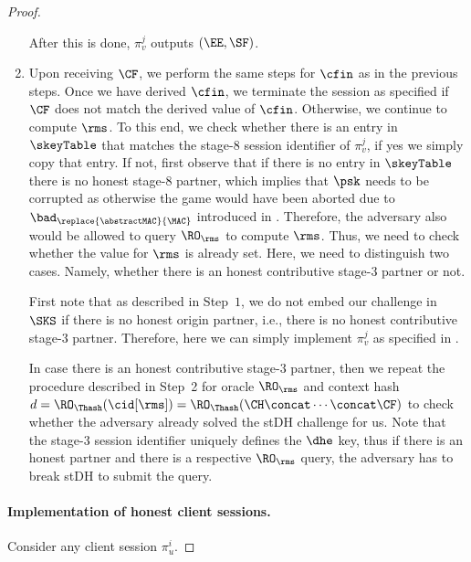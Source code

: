 \begin{proof}
\begin{enumerate}
		After this is done, $\pi_v^j$ outputs $(\EE, \SF)$.
%		
		\item Upon receiving $\CF$, we perform the same steps for $\cfin$ as in the previous steps.
		Once we have derived $\cfin$, we terminate the session as specified if $\CF$ does not match the derived value of $\cfin$.
		Otherwise, we continue to compute $\rms$.
		To this end, we check whether there is an entry in $\skeyTable$ that matches the stage-$8$ session identifier of $\pi_v^j$, if yes we simply copy that entry.
		If not, first observe that if there is no entry in $\skeyTable$ there is no honest stage-$8$ partner, which implies that $\psk$ needs to be corrupted as otherwise the game would have been aborted due to $\bad_{\replace{\abstractMAC}{\MAC}}$ introduced in .
		Therefore, the adversary also would be allowed to query $\RO_\rms$ to compute $\rms$.
		Thus, we need to check whether the value for $\rms$ is already set.
		Here, we need to distinguish two cases.
		Namely, whether there is an honest contributive stage-$3$ partner or not.
		
		First note that as described in Step~$1$, we do not embed our challenge in $\SKS$ if there is no honest origin partner, i.e., there is no honest contributive stage-$3$ partner.
		Therefore, here we can simply implement $\pi_v^j$ as specified in \thisGame.
		
		In case there is an honest contributive stage-$3$ partner, then we repeat the procedure described in Step~2 for oracle $\RO_\rms$ and context hash $d = \RO_\Thash(\cid[\rms]) = \RO_\Thash(\CH \concat \dotsb \concat \CF)$ to check whether the adversary already solved the stDH challenge for us.
		Note that the stage-$3$ session identifier uniquely defines the $\dhe$ key, thus if there is an honest partner and there is a respective $\RO_\rms$ query, the adversary has to break stDH to submit the query.
	\end{enumerate}
	
	\paragraph{Implementation of honest client sessions.}
	Consider any client session $\pi_u^i$.
	

\end{proof}
